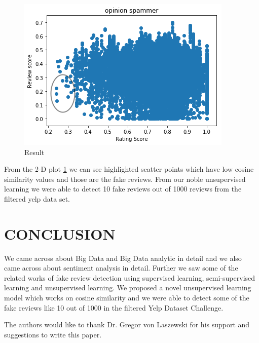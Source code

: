 \documentclass[sigconf]{acmart}
\begin{document}
\begin{figure}[!ht]
  \centering\includegraphics[width=\columnwidth]{project/images/sample.png}
  \caption{Result}\label{f:op}
\end{figure}
From the 2-D plot \ref{f:op} we can see highlighted scatter points which have low cosine similarity values and those are the fake reviews. From our noble unsupervised learning we were able to detect 10 fake reviews out of 1000 reviews from the filtered yelp data set.


\section{CONCLUSION}
We came across about Big Data and Big Data analytic in detail and we also came across about sentiment analysis in detail. Further we saw some of the related works of fake review detection using supervised learning, semi-supervised learning and unsupervised learning. We proposed a novel unsupervised learning model which works on cosine similarity and we were able to detect some of the fake reviews like 10 out of 1000 in the filtered Yelp Dataset Challenge. 

\begin{acks}
The authors would like to thank Dr. Gregor von Laszewski for his support and suggestions to write this paper.
\end{acks}


 

\appendix


\end{document}
